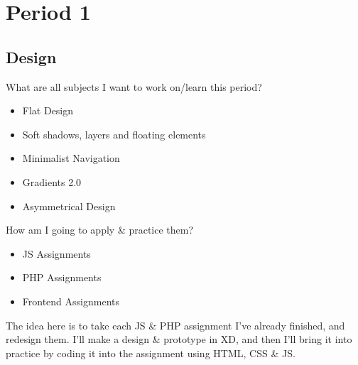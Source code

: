\section{Period 1}

\subsection{Design}
What are all subjects I want to work on/learn this period?

\begin{itemize}
  \item Flat Design
  \item Soft shadows, layers and floating elements
  \item Minimalist Navigation
  \item Gradients 2.0
  \item Asymmetrical Design
\end{itemize}

How am I going to apply \& practice them?
\begin{itemize}
  \item JS Assignments
  \item PHP Assignments
  \item Frontend Assignments
\end{itemize}

The idea here is to take each JS \& PHP assignment I've already finished, and redesign them.
I'll make a design \& prototype in XD, and then I'll bring it into practice by coding it into 
the assignment using HTML, CSS \& JS.
